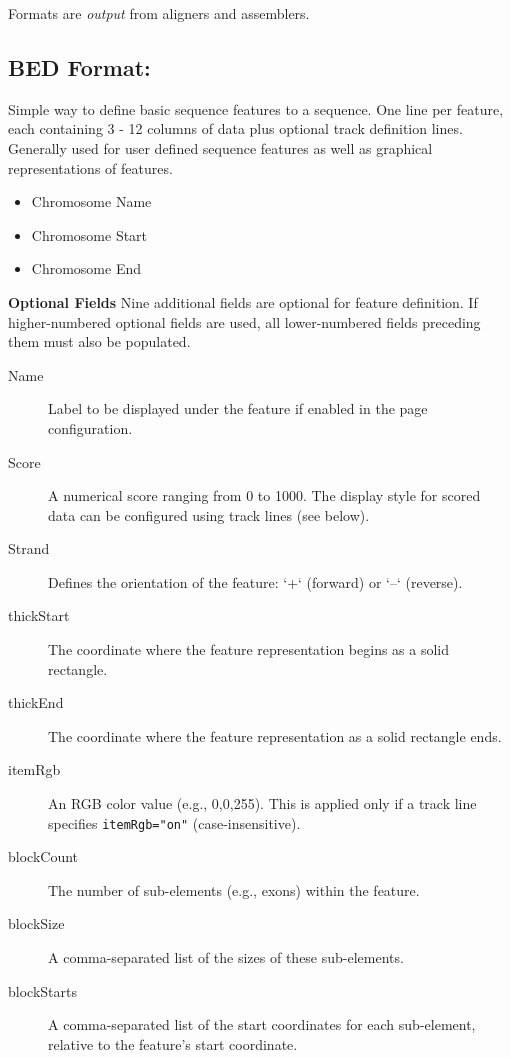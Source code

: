 \documentclass[../main.tex]{subfiles}
\begin{document}
Formats are \textit{output} from aligners and assemblers.

\subsection*{BED Format:} Simple way to define basic sequence features to a sequence. One line per feature, each containing 3 - 12 columns of data plus optional track definition lines. Generally used for user defined sequence features as well as graphical representations of features.

\begin{itemize}
    \item Chromosome Name
    \item Chromosome Start
    \item Chromosome End
\end{itemize}

\textbf{Optional Fields}
Nine additional fields are optional for feature definition. If higher-numbered optional fields are used, all lower-numbered fields preceding them must also be populated.

\begin{description}
    \item[Name] Label to be displayed under the feature if enabled in the page configuration.
    \item[Score] A numerical score ranging from 0 to 1000. The display style for scored data can be configured using track lines (see below).
    \item[Strand] Defines the orientation of the feature: `+` (forward) or `–` (reverse).
    \item[thickStart] The coordinate where the feature representation begins as a solid rectangle.
    \item[thickEnd] The coordinate where the feature representation as a solid rectangle ends.
    \item[itemRgb] An RGB color value (e.g., 0,0,255). This is applied only if a track line specifies \texttt{itemRgb="on"} (case-insensitive).
    \item[blockCount] The number of sub-elements (e.g., exons) within the feature.
    \item[blockSize] A comma-separated list of the sizes of these sub-elements.
    \item[blockStarts] A comma-separated list of the start coordinates for each sub-element, relative to the feature's start coordinate.
\end{description}
\end{document}
